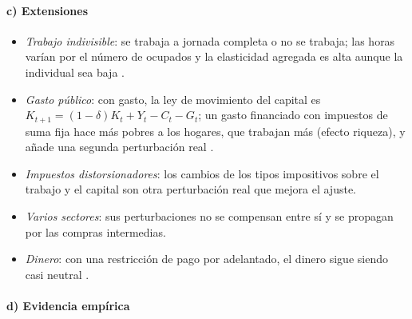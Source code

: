 \documentclass[11pt]{article}
\begin{document}
\paragraph{c) Extensiones}

\begin{itemize}
\item \emph{Trabajo indivisible}: se trabaja a jornada completa o no se trabaja; las horas varían por el número de ocupados y la elasticidad agregada es alta aunque la individual sea baja\nocite{Hansen1985Indivisible,Rogerson1988Indivisible} .
\item \emph{Gasto público}: con gasto, la ley de movimiento del capital es $K_{t+1}=(1-\delta)K_t+Y_t-C_t-G_t$; un gasto financiado con impuestos de suma fija hace más pobres a los hogares, que trabajan más (efecto riqueza), y añade una segunda perturbación real\nocite{ChristianoEichenbaum1992Current,BaxterKing1993Fiscal} .
\item \emph{Impuestos distorsionadores}: los cambios de los tipos impositivos sobre el trabajo y el capital son otra perturbación real que mejora el ajuste\nocite{McGrattan1994Macroeconomic}.
\item \emph{Varios sectores}: sus perturbaciones no se compensan entre sí y se propagan por las compras intermedias\nocite{LongPlosser1983Real}.
\item \emph{Dinero}: con una restricción de pago por adelantado, el dinero sigue siendo casi neutral\nocite{CooleyHansen1989Inflation} .
\end{itemize}

\paragraph{d) Evidencia empírica}
\end{document}
